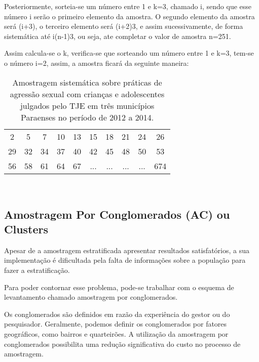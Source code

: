 Posteriormente, sorteia-se um número entre 1 e k=3, chamado i, sendo que esse
número i serão o primeiro elemento da amostra. O segundo elemento da amostra será
(i+3), o terceiro elemento será (i+2)3, e assim sucessivamente, de forma sistemática
até i(n-1)3, ou seja, ate completar o valor de amostra n=251.\vskip0.3cm

Assim calcula-se o k, verifica-se que sorteando um número entre 1 e k=3, tem-se
o número i=2, assim, a amostra ficará da seguinte maneira:



\begin{table}[!htb]
    \centering
    {
    \caption{Amostragem sistemática sobre práticas de agressão sexual com crianças e adolescentes julgados pelo TJE em três municípios Paraenses no período de 2012 a 2014.}
    \label{amostras estratificada}
    \vspace{0.1cm}
\begin{tabular}{c|c|c|c|c|c|c|c|c|c}
  \hline\hline
   2  & 5  & 7  & 10 & 13 & 15 & 18 & 21 & 24 & 26 \\
   29 & 32 & 34 & 37 & 40 & 42 & 45 & 48 & 50 & 53 \\
   56 & 58 & 61 & 64 & 67 & ... & ... & ... & ... & 674 \\
  \hline\hline
\end{tabular}}
\\
\hspace{-1.0cm}
\end{table}





\subsection{Amostragem Por Conglomerados (AC) ou Clusters}

\inic Apesar de a amostragem estratificada apresentar resultados
satisfatórios, a sua implementação é dificultada pela falta
de informações sobre a população para fazer a estratificação.\vskip0.3cm

Para poder contornar esse problema, pode-se trabalhar com o
esquema de levantamento chamado amostragem por conglomerados.\vskip0.3cm

Os conglomerados são definidos em razão da experiência
do gestor ou do pesquisador. Geralmente, podemos definir os
conglomerados por fatores geográficos, como bairros e quarteirões.
A utilização da amostragem por conglomerados possibilita uma
redução significativa do custo no processo de amostragem.\vskip0.3cm

